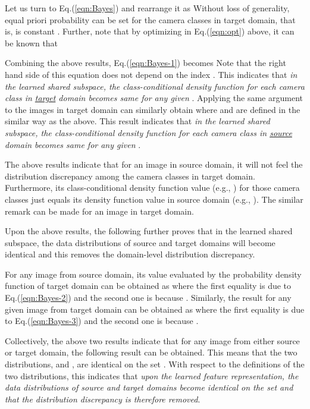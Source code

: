 \documentclass[10pt,twocolumn,letterpaper]{article}
\begin{document}
Let us turn to Eq.(\ref{eqn:Bayes}) and rearrange it as
Without loss of generality, equal priori probability can be set for the  camera classes in target domain, that is,  is constant . Further, note that by optimizing  in Eq.(\ref{eqn:opt}) above, it can be known that 

Combining the above results, Eq.(\ref{eqn:Bayes-1}) becomes
Note that the right hand side of this equation does not depend on the index . This indicates that \textit{in the learned shared subspace, the class-conditional density function for each camera class in \underline{target} domain becomes same for any given }. Applying the same argument to the images in target domain can similarly obtain 
where  and  are defined in the similar way as the above. This result indicates that \textit{in the learned shared subspace, the class-conditional density function for each camera class in \underline{source} domain becomes same for any given }. 

The above results indicate that for an image in source domain, it will not feel the distribution discrepancy among the camera classes in target domain. Furthermore, its class-conditional density function value (e.g., ) for those camera classes just equals its density function value in source domain (e.g., ). The similar remark can be made for an image in target domain. 

Upon the above results, the following further proves that in the learned shared subspace, the data distributions of source and target domains will become identical and this removes the domain-level distribution discrepancy. 

For any image  from source domain, its value evaluated by the probability density function of target domain can be obtained as
where the first equality is due to Eq.(\ref{eqn:Bayes-2}) and the second one is because . Similarly, the result for any given image  from target domain can be obtained as
where the first equality is due to Eq.(\ref{eqn:Bayes-3}) and the second one is because . 

Collectively, the above two results indicate that for any image  from either source or target domain, the following result can be obtained. 
 This means that the two distributions,  and , are identical on the set . With respect to the definitions of the two distributions, this indicates that \textit{upon the learned feature representation, the data distributions of source and target domains become identical on the set  and that the distribution discrepancy is therefore removed}. \quad\quad\quad
\end{document}
